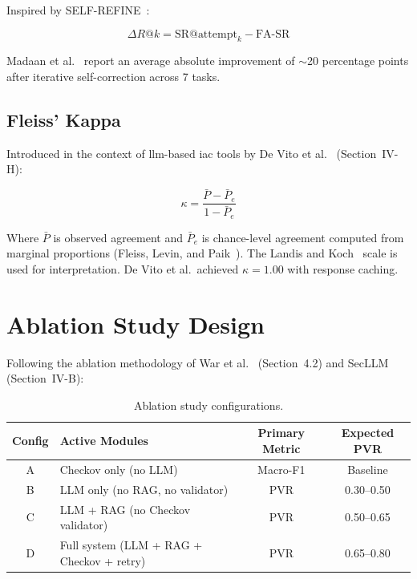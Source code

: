 \documentclass[12pt, a4paper]{report}
\begin{document}
Inspired by SELF-REFINE~\citep{madaan2023selfrefine}:

\begin{equation}
  \Delta R@k = \text{SR}@\text{attempt}_k - \text{FA-SR}
  \label{eq:retry}
\end{equation}

Madaan et al.~\citep{madaan2023selfrefine} report an average absolute improvement of
$\sim$20 percentage points after iterative self-correction across 7 tasks.

\subsection{Fleiss' Kappa}

Introduced in the context of \gls{llm}-based \gls{iac} tools by De Vito et
al.~\citep{devito2025secllm} (Section~IV-H):

\begin{equation}
  \kappa = \frac{\bar{P} - \bar{P}_e}{1 - \bar{P}_e}
  \label{eq:kappa}
\end{equation}

Where $\bar{P}$ is observed agreement and $\bar{P}_e$ is chance-level agreement
computed from marginal proportions (Fleiss, Levin, and Paik~\citep{fleiss2013statistical}).
The Landis and Koch~\citep{landis1977kappa} scale is used for interpretation.
De Vito et al.\ achieved $\kappa = 1.00$ with response caching.

\section{Ablation Study Design}

Following the ablation methodology of War et al.~\citep{war2025detection}
(Section~4.2) and SecLLM~\citep{devito2025secllm} (Section~IV-B):

\begin{table}[H]
  \centering
  \caption{Ablation study configurations.}
  \label{tab:ablation}
  \begin{tabularx}{0.85\textwidth}{cXcc}
    \toprule
    \textbf{Config} & \textbf{Active Modules} &
    \textbf{Primary Metric} & \textbf{Expected PVR} \\
    \midrule
    A & Checkov only (no LLM) & Macro-F1 & Baseline \\
    B & LLM only (no RAG, no validator) & PVR & 0.30--0.50 \\
    C & LLM + RAG (no Checkov validator) & PVR & 0.50--0.65 \\
    D & Full system (LLM + RAG + Checkov + retry) & PVR & 0.65--0.80 \\
    \bottomrule
  \end{tabularx}
\end{table}
\end{document}
